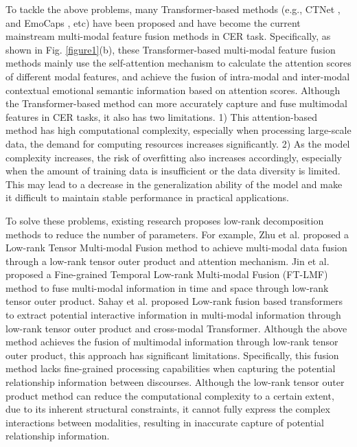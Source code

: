 {To tackle the above problems, many Transformer-based methods (e.g., CTNet \cite{lian2021ctnet}, and EmoCaps \cite{li2022emocaps}, etc) have been proposed and have become the current mainstream multi-modal feature fusion methods in CER task. Specifically, as shown in Fig. \ref{figure1}(b), these Transformer-based multi-modal feature fusion methods mainly use the self-attention mechanism to calculate the attention scores of different modal features, and achieve the fusion of intra-modal and inter-modal contextual emotional semantic information based on attention scores. {Although the Transformer-based method can more accurately capture and fuse multimodal features in CER tasks, it also has two limitations. 1) This attention-based method has high computational complexity, especially when processing large-scale data, the demand for computing resources increases significantly. 2) As the model complexity increases, the risk of overfitting also increases accordingly, especially when the amount of training data is insufficient or the data diversity is limited. This may lead to a decrease in the generalization ability of the model and make it difficult to maintain stable performance in practical applications.}

{To solve these problems, existing research proposes low-rank decomposition methods \cite{kolda2009tensor} to reduce the number of parameters. For example, Zhu et al. \cite{zhu2020multimodal} proposed a Low-rank Tensor Multi-modal Fusion method to achieve multi-modal data fusion through a low-rank tensor outer product and attention mechanism. Jin et al. \cite{jin-etal-2020-dual} proposed a Fine-grained Temporal Low-rank Multi-modal Fusion (FT-LMF) method to fuse multi-modal information in time and space through low-rank tensor outer product. Sahay et al. \cite{sahay2020low} proposed Low-rank fusion based transformers to extract potential interactive information in multi-modal information through low-rank tensor outer product and cross-modal Transformer. {Although the above method achieves the fusion of multimodal information through low-rank tensor outer product, this approach has significant limitations. Specifically, this fusion method lacks fine-grained processing capabilities when capturing the potential relationship information between discourses. Although the low-rank tensor outer product method can reduce the computational complexity to a certain extent, due to its inherent structural constraints, it cannot fully express the complex interactions between modalities, resulting in inaccurate capture of potential relationship information.} 

}}
